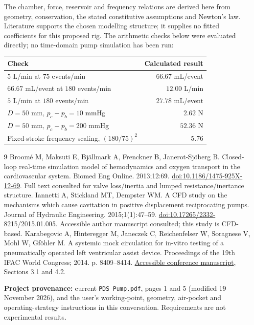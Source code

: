 \documentclass[11pt,a4paper]{article}
\begin{document}
The chamber, force, reservoir and frequency relations are derived here from geometry, conservation, the stated constitutive assumptions and Newton's law. Literature supports the chosen modelling structure; it supplies no fitted coefficients for this proposed rig. The arithmetic checks below were evaluated directly; no time-domain pump simulation has been run:
\begin{center}\small
\begin{tabular}{@{}lr@{}}\toprule
\textbf{Check} & \textbf{Calculated result}\\\midrule
$5$ L/min at $75$ events/min & $66.67$ mL/event\\
$66.67$ mL/event at $180$ events/min & $12.00$ L/min\\
$5$ L/min at $180$ events/min & $27.78$ mL/event\\
$D=50$ mm, $p_c-p_b=10$ mmHg & $2.62$ N\\
$D=50$ mm, $p_c-p_b=200$ mmHg & $52.36$ N\\
Fixed-stroke frequency scaling, $(180/75)^2$ & $5.76$\\\bottomrule
\end{tabular}
\end{center}

\newpage
{\footnotesize
\begin{thebibliography}{9}
 Broom\'e M, Maksuti E, Bj\"allmark A, Frenckner B, Janerot-Sj\"oberg B. Closed-loop real-time simulation model of hemodynamics and oxygen transport in the cardiovascular system. Biomed Eng Online. 2013;12:69. \href{https://doi.org/10.1186/1475-925X-12-69}{doi:10.1186/1475-925X-12-69}. Full text consulted for valve loss/inertia and lumped resistance/inertance structure.
 Iannetti A, Stickland MT, Dempster WM. A CFD study on the mechanisms which cause cavitation in positive displacement reciprocating pumps. Journal of Hydraulic Engineering. 2015;1(1):47--59. \href{https://doi.org/10.17265/2332-8215/2015.01.005}{doi:10.17265/2332-8215/2015.01.005}. Accessible author manuscript consulted; this study is CFD-based.
 Karabegovic A, Hinteregger M, Janeczek C, Reichenfelser W, Soragnese V, Mohl W, Gf\"ohler M. A systemic mock circulation for in-vitro testing of a pneumatically operated left ventricular assist device. Proceedings of the 19th IFAC World Congress; 2014. p. 8409--8414. \href{https://skoge.folk.ntnu.no/prost/proceedings/ifac2014/media/files/2587.pdf}{Accessible conference manuscript}, Sections 3.1 and 4.2.
\end{thebibliography}}
\textbf{Project provenance:} current \texttt{PDS\_Pump.pdf}, pages 1 and 5 (modified 19 November 2026), and the user's working-point, geometry, air-pocket and operating-strategy instructions in this conversation. Requirements are not experimental results.
\end{document}
